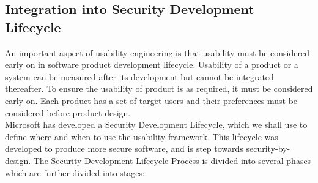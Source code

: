 \subsection{Integration into Security Development Lifecycle}
An important aspect of usability engineering is that usability must be considered early on in software product development lifecycle. Usability of a product or a system can be measured after its development but cannot be integrated thereafter. To ensure the usability of product is as required, it must be considered early on. Each product has a set of target users and their preferences must be considered before product design. \\
Microsoft has developed a Security Development Lifecycle\cite{howard2006security}, which we shall use to define where and when to use the usability framework. This lifecycle was developed to produce more secure software, and is step towards security-by-design. The Security Development Lifecycle Process is divided into several phases which are further divided into stages:
